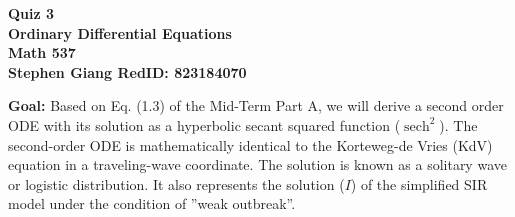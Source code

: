 \documentclass[11pt]{article}
\DeclareMathOperator{\sech}{sech}
\newcommand{\skipline}{\vspace{\baselineskip}}
\begin{document}
	
	\begin{center}
		\textbf{Quiz 3} \\
		\textbf{Ordinary Differential Equations} \\
		\textbf{Math 537} \\
		\textbf{Stephen Giang RedID: 823184070} \\
		\skipline \skipline
	\end{center}

	\textbf{Goal:} Based on Eq. (1.3) of the Mid-Term Part A, we will derive a second order ODE with its solution as a hyperbolic secant squared function ($\sech^2$). The second-order ODE is mathematically identical to the Korteweg-de Vries (KdV) equation in a traveling-wave coordinate. The solution is known as a solitary wave or logistic distribution. It also represents the solution ($I$) of the simplified SIR model under the condition of ”weak outbreak”.
	\skipline 
	
\end{document}
